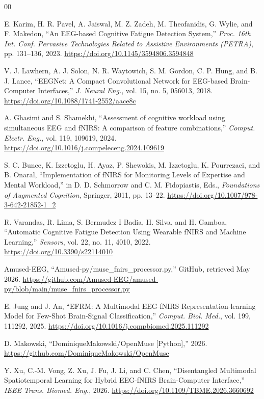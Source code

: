 \documentclass[conference]{IEEEtran}
\begin{document}
\begin{thebibliography}{00}

E. Karim, H. R. Pavel, A. Jaiswal, M. Z. Zadeh, M. Theofanidis, G. Wylie, and F. Makedon,
``An EEG-based Cognitive Fatigue Detection System,''
\textit{Proc. 16th Int. Conf. Pervasive Technologies Related to Assistive Environments (PETRA)},
pp. 131--136, 2023.
\url{https://doi.org/10.1145/3594806.3594848}

V. J. Lawhern, A. J. Solon, N. R. Waytowich, S. M. Gordon, C. P. Hung, and B. J. Lance,
``EEGNet: A Compact Convolutional Network for EEG-based Brain-Computer Interfaces,''
\textit{J. Neural Eng.}, vol. 15, no. 5, 056013, 2018.
\url{https://doi.org/10.1088/1741-2552/aace8c}

A. Ghasimi and S. Shamekhi,
``Assessment of cognitive workload using simultaneous EEG and fNIRS: A comparison of feature combinations,''
\textit{Comput. Electr. Eng.}, vol. 119, 109619, 2024.
\url{https://doi.org/10.1016/j.compeleceng.2024.109619}

S. C. Bunce, K. Izzetoglu, H. Ayaz, P. Shewokis, M. Izzetoglu, K. Pourrezaei, and B. Onaral,
``Implementation of fNIRS for Monitoring Levels of Expertise and Mental Workload,''
in D. D. Schmorrow and C. M. Fidopiastis, Eds.,
\textit{Foundations of Augmented Cognition}, Springer, 2011, pp. 13--22.
\url{https://doi.org/10.1007/978-3-642-21852-1_2}

R. Varandas, R. Lima, S. Bermudez I Badia, H. Silva, and H. Gamboa,
``Automatic Cognitive Fatigue Detection Using Wearable fNIRS and Machine Learning,''
\textit{Sensors}, vol. 22, no. 11, 4010, 2022.
\url{https://doi.org/10.3390/s22114010}

Amused-EEG,
``Amused-py/muse\_fnirs\_processor.py,''
GitHub, retrieved May 2026.
\url{https://github.com/Amused-EEG/amused-py/blob/main/muse_fnirs_processor.py}

E. Jung and J. An,
``EFRM: A Multimodal EEG-fNIRS Representation-learning Model for Few-Shot Brain-Signal Classification,''
\textit{Comput. Biol. Med.}, vol. 199, 111292, 2025.
\url{https://doi.org/10.1016/j.compbiomed.2025.111292}

D. Makowski,
``DominiqueMakowski/OpenMuse [Python],'' 2026.
\url{https://github.com/DominiqueMakowski/OpenMuse}

Y. Xu, C.-M. Vong, Z. Xu, J. Fu, J. Li, and C. Chen,
``Disentangled Multimodal Spatiotemporal Learning for Hybrid EEG-fNIRS Brain-Computer Interface,''
\textit{IEEE Trans. Biomed. Eng.}, 2026.
\url{https://doi.org/10.1109/TBME.2026.3660692}

\end{thebibliography}
\end{document}
